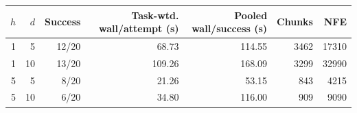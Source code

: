 \begin{tabular}{rrrrrrr}
\toprule
$h$ & $d$ & Success & Task-wtd. wall/attempt (s) & Pooled wall/success (s) & Chunks & NFE\\
\midrule
1 & 5 & 12/20 & 68.73 & 114.55 & 3462 & 17310\\
1 & 10 & 13/20 & 109.26 & 168.09 & 3299 & 32990\\
5 & 5 & 8/20 & 21.26 & 53.15 & 843 & 4215\\
5 & 10 & 6/20 & 34.80 & 116.00 & 909 & 9090\\
\bottomrule
\end{tabular}

